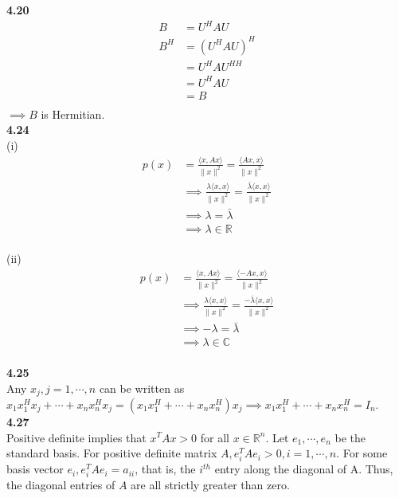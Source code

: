 \documentclass[letterpaper,12pt]{article}
\theoremstyle{definition}
\begin{document}
\noindent\textbf{4.20}\\
\begin{align*}
B &= U^HAU\\
B^H &= (U^HAU)^H\\
&= U^HAU^{HH}\\
&= U^HAU\\
&= B\\
\end{align*}
$\implies B$ is Hermitian.\\

\noindent\textbf{4.24}\\
(i) \begin{align*}
p(x) &= \frac{\langle x, Ax \rangle}{\|x\|^2} = \frac{\langle Ax, x \rangle}{\|x\|^2}\\
&\implies \frac{\lambda \langle x, x \rangle}{\|x\|^2} = \frac{\bar{\lambda} \langle x, x \rangle}{\|x\|^2}\\
&\implies \lambda = \bar{\lambda}\\
&\implies \lambda \in \mathbb{R}
\end{align*}\\

\noindent (ii) \begin{align*}
p(x) &= \frac{\langle x, Ax \rangle}{\|x\|^2} = \frac{\langle -Ax, x \rangle}{\|x\|^2}\\
&\implies \frac{\lambda \langle x, x \rangle}{\|x\|^2} = \frac{-\bar{\lambda} \langle x, x \rangle}{\|x\|^2}\\
&\implies -\lambda = \bar{\lambda}\\
&\implies \lambda \in \mathbb{C}
\end{align*}\\

\noindent\textbf{4.25}\\
Any $x_j, j=1,\cdots,n$ can be written as $x_1x_1^Hx_j + \cdots + x_nx_n^Hx_j = (x_1x_1^H + \cdots + x_nx_n^H)x_j \implies x_1x_1^H + \cdots + x_nx_n^H = I_n$.\\

\noindent\textbf{4.27}\\
Positive definite implies that $x^TAx > 0$ for all $x \in \mathbb{R}^n$. Let $e_1, \cdots , e_n$ be the standard basis. For positive definite matrix $A, e_i^TAe_i > 0, i = 1, \cdots, n$. For some basis vector $e_i, e_i^TAe_i = a_{ii}$, that is, the $i^{th}$ entry along the diagonal of A. Thus, the diagonal entries of $A$ are all strictly greater than zero.\\
\end{document}
